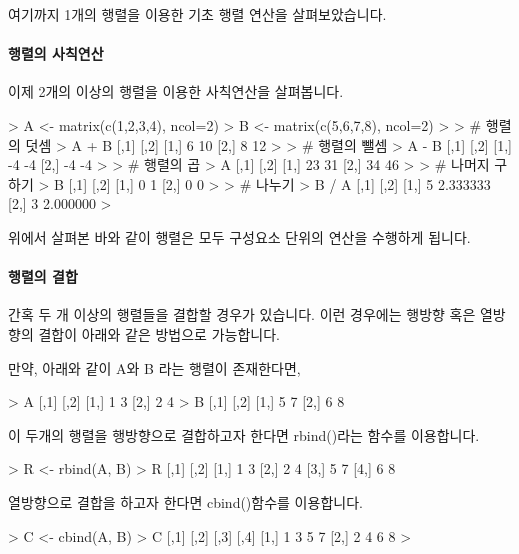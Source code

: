 \documentclass{book}
\begin{document}
여기까지 1개의 행렬을 이용한 기초 행렬 연산을 살펴보았습니다. 

\paragraph{행렬의 사칙연산} 이제 2개의 이상의 행렬을 이용한 사칙연산을 살펴봅니다.

\begin{Schunk}
\begin{Soutput}
> A <- matrix(c(1,2,3,4), ncol=2)
> B <- matrix(c(5,6,7,8), ncol=2)
>
> # 행렬의 덧셈
> A + B 
     [,1] [,2]
[1,]    6   10
[2,]    8   12
>
> # 행렬의 뺄셈
> A - B
     [,1] [,2]
[1,]   -4   -4
[2,]   -4   -4
>
> # 행렬의 곱 
> A %
     [,1] [,2]
[1,]   23   31
[2,]   34   46
>
> # 나머지 구하기
> B %
     [,1] [,2]
[1,]    0    1
[2,]    0    0
>
> # 나누기 
> B / A
     [,1]     [,2]
[1,]    5 2.333333
[2,]    3 2.000000
> 
\end{Soutput}
\end{Schunk}

위에서 살펴본 바와 같이 행렬은 모두 구성요소 단위의 연산을 수행하게 됩니다. 

\paragraph{행렬의 결합}  간혹 두 개 이상의 행렬들을 결합할 경우가 있습니다.
이런 경우에는 행방향 혹은 열방향의 결합이 아래와 같은 방법으로 가능합니다.

만약, 아래와 같이 A와 B 라는 행렬이 존재한다면, 

\begin{Schunk}
\begin{Soutput}
> A
     [,1] [,2]
[1,]    1    3
[2,]    2    4
> B
     [,1] [,2]
[1,]    5    7
[2,]    6    8
\end{Soutput}
\end{Schunk}

이 두개의 행렬을 행방향으로 결합하고자 한다면 rbind()라는 함수를 이용합니다.

\begin{Schunk}
\begin{Soutput}
> R <- rbind(A, B)
> R
     [,1] [,2]
[1,]    1    3
[2,]    2    4
[3,]    5    7
[4,]    6    8
\end{Soutput}
\end{Schunk}

열방향으로 결합을 하고자 한다면 cbind()함수를 이용합니다. 

\begin{Schunk}
\begin{Soutput}
> C <- cbind(A, B)
> C
     [,1] [,2] [,3] [,4]
[1,]    1    3    5    7
[2,]    2    4    6    8
> 
\end{Soutput}
\end{Schunk}
\end{document}

